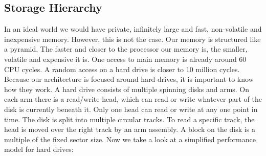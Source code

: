 \subsection{Storage Hierarchy}
In an ideal world we would have private, infinitely large and fast, non-volatile and inexpensive memory. However, this is not the case. Our memory is structured like a pyramid. The faster and closer to the processor our memory is, the smaller, volatile and expensive it is. One access to main memory is already around 60 CPU cycles. A random access on a hard drive is closer to 10 million cycles. \\
Because our architecture is focused around hard drives, it is important to know how they work. A hard drive consists of multiple spinning disks and arms. On each arm there is a read/write head, which can read or write whatever part of the disk is currently beneath it. Only one head can read or write at any one point in time. The disk is split into multiple circular tracks. To read a specific track, the head is moved over the right track by an arm assembly. A block on the disk is a multiple of the fixed sector size. Now we take a look at a simplified performance model for hard drives:
